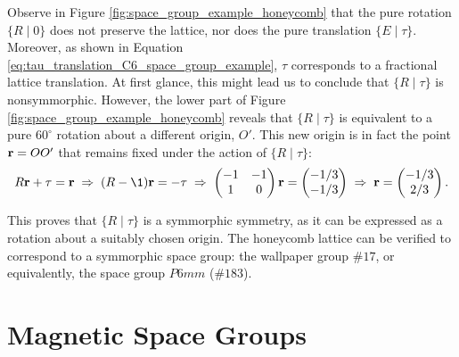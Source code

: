 \begin{example}
Observe in Figure \ref{fig:space_group_example_honeycomb} that the pure rotation \(\{R \mid 0\}\) does not preserve the lattice, nor does the pure translation \(\{E \mid \tau\}\). Moreover, as shown in Equation \ref{eq:tau_translation_C6_space_group_example}, \(\tau\) corresponds to a fractional lattice translation. At first glance, this might lead us to conclude that \(\{R \mid \tau\}\) is nonsymmorphic. However, the lower part of Figure \ref{fig:space_group_example_honeycomb} reveals that \(\{R \mid \tau\}\) is equivalent to a pure \(60^\circ\) rotation about a different origin, \(O'\). This new origin is in fact the point \(\vb{r} = OO'\) that remains fixed under the action of \(\{R \mid \tau\}\):
\begin{equation} \label{eq:fixed_point_O'_spacegroup_example}
R \r + \tau = \r \implies (R-\1) \r = -\tau \implies
\begin{pmatrix}
-1 & -1 \\
1 & 0
\end{pmatrix}
\r =
\begin{pmatrix}
-1/3 \\ -1/3
\end{pmatrix} \implies
\r =
\begin{pmatrix}
-1/3 \\ 2/3
\end{pmatrix} .
\end{equation}

This proves that \(\{R \mid \tau\}\) is a symmorphic symmetry, as it can be expressed as a rotation about a suitably chosen origin. The honeycomb lattice can be verified to correspond to a symmorphic space group: the wallpaper group \(\#17\), or equivalently, the space group \(P6mm\) (\(\#183\)).
\end{example}


%


\section{Magnetic Space Groups} \label{sec:magnetic_space_groups}

